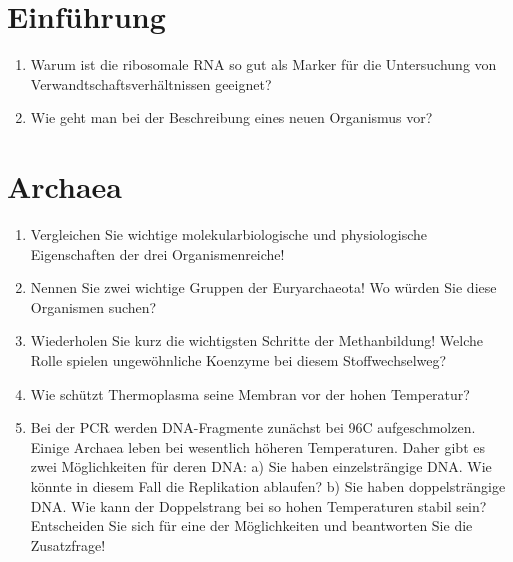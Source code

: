 
\section{Einführung}
\begin{enumerate}
\item Warum ist die ribosomale RNA so gut als Marker für die Untersuchung von Verwandtschaftsverhältnissen geeignet?
\item Wie geht man bei der Beschreibung eines neuen Organismus vor?
\end{enumerate}

\section{Archaea}
\begin{enumerate}
	\item Vergleichen Sie wichtige molekularbiologische und physiologische Eigenschaften der drei Organismenreiche!
	\item Nennen Sie zwei wichtige Gruppen der Euryarchaeota! Wo würden Sie diese Organismen suchen?
	\item Wiederholen Sie kurz die wichtigsten Schritte der Methanbildung! Welche Rolle spielen ungewöhnliche Koenzyme bei diesem Stoffwechselweg?
	\item Wie schützt Thermoplasma seine Membran vor der hohen Temperatur?
	\item Bei der PCR werden DNA-Fragmente zunächst bei 96\textdegree C aufgeschmolzen. Einige Archaea leben bei wesentlich höheren Temperaturen. Daher gibt es zwei Möglichkeiten für deren DNA:
a) Sie haben einzelsträngige DNA. Wie könnte in diesem Fall die Replikation ablaufen?
b) Sie haben doppelsträngige DNA. Wie kann der Doppelstrang bei so hohen Temperaturen stabil sein? Entscheiden Sie sich für eine der Möglichkeiten und beantworten Sie die Zusatzfrage!
\end{enumerate}
	
